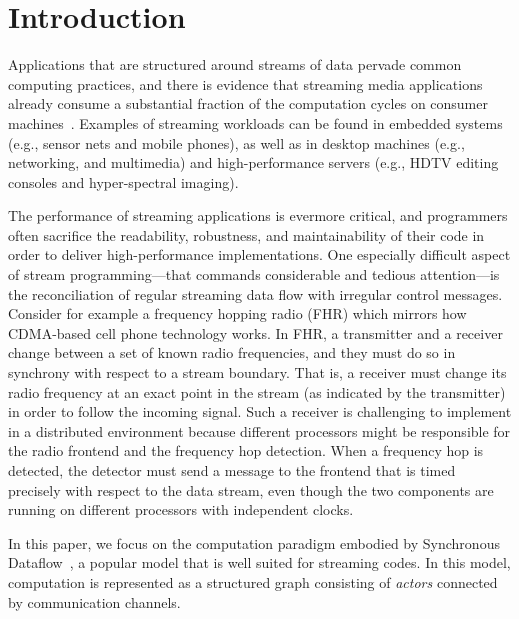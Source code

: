 \section{Introduction}


Applications that are structured around streams of data pervade common
computing  practices,  and  there  is evidence  that  streaming  media
applications already consume a substantial fraction of the computation
cycles    on    consumer   machines~\cite{Rix98}.
Examples  of streaming  workloads  can be  found  in embedded  systems
(e.g., sensor nets and mobile  phones), as well as in desktop machines
(e.g., networking, and  multimedia) and high-performance servers (e.g.,
HDTV editing consoles and hyper-spectral imaging). 

The performance of streaming applications is evermore critical, and
programmers often sacrifice the readability, robustness, and
maintainability of their code in order to deliver high-performance
implementations.  One especially difficult aspect of stream
programming---that commands considerable and tedious attention---is
the reconciliation of regular streaming data flow with irregular
control messages. Consider for example a frequency hopping radio (FHR)
which mirrors how CDMA-based cell phone technology works.  In FHR, a
transmitter and a receiver change between a set of known radio
frequencies, and they must do so in synchrony with respect to a stream
boundary. That is, a receiver must change its radio frequency at an
exact point in the stream (as indicated by the transmitter) in order
to follow the incoming signal.  Such a receiver is challenging to
implement in a distributed environment because different processors
might be responsible for the radio frontend and the frequency hop
detection.  When a frequency hop is detected, the detector must send a
message to the frontend that is timed precisely with respect to the
data stream, even though the two components are running on different
processors with independent clocks.

In  this  paper, we focus on the 
computation paradigm embodied by Synchronous  Dataflow~\cite{LM87-i},
a popular  model  that  is well suited for  streaming codes.  
In this model, computation is represented  as a structured graph consisting
of {\it actors} connected by communication channels.

